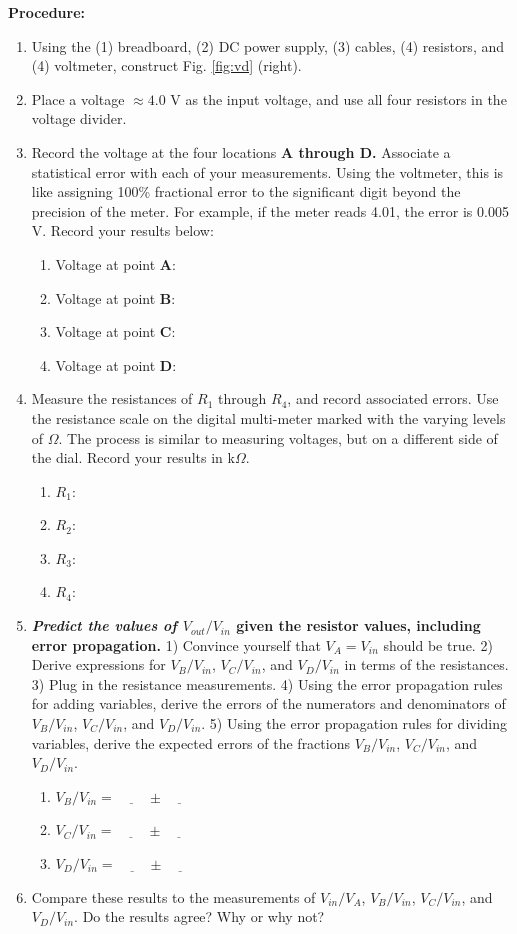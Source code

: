 \documentclass[12pt]{article}
\begin{document}
\textbf{Procedure:}

\begin{enumerate}
\item Using the (1) breadboard, (2) DC power supply, (3) cables, (4) resistors, and (4) voltmeter, construct Fig. \ref{fig:vd} (right).
\item Place a voltage $\approx 4.0$ V as the input voltage, and use all four resistors in the voltage divider.
\item Record the voltage at the four locations \textbf{A through D.}  Associate a statistical error with each of your measurements.  Using the voltmeter, this is like assigning 100\% fractional error to the significant digit beyond the precision of the meter.  For example, if the meter reads 4.01, the error is 0.005 V.  Record your results below:
\begin{enumerate}
\item Voltage at point \textbf{A}:
\item Voltage at point \textbf{B}:
\item Voltage at point \textbf{C}:
\item Voltage at point \textbf{D}:
\end{enumerate}
\item Measure the resistances of $R_1$ through $R_4$, and record associated errors.  Use the resistance scale on the digital multi-meter marked with the varying levels of $\Omega$.  The process is similar to measuring voltages, but on a different side of the dial.  Record your results in k$\Omega$.
\begin{enumerate}
\item $R_1$: 
\item $R_2$: 
\item $R_3$: 
\item $R_4$: 
\end{enumerate}
\item \textbf{\textit{Predict the values of $V_{out}/V_{in}$} given the resistor values, including error propagation.}  1) Convince yourself that $V_A = V_{in}$ should be true.  2) Derive expressions for $V_B/V_{in}$, $V_C/V_{in}$, and $V_D/V_{in}$ in terms of the resistances.  3) Plug in the resistance measurements.  4) Using the error propagation rules for adding variables, derive the errors of the numerators and denominators of $V_B/V_{in}$, $V_C/V_{in}$, and $V_D/V_{in}$.  5) Using the error propagation rules for dividing variables, derive the expected errors of the fractions $V_B/V_{in}$, $V_C/V_{in}$, and $V_D/V_{in}$. \\ \vspace{4cm}
\begin{enumerate}
\item $V_B/V_{in}=\underline{~~~~~~~~~~}\pm\underline{~~~~~~~~~~}$
\item $V_C/V_{in}=\underline{~~~~~~~~~~}\pm\underline{~~~~~~~~~~}$
\item $V_D/V_{in}=\underline{~~~~~~~~~~}\pm\underline{~~~~~~~~~~}$
\end{enumerate}
\item Compare these results to the measurements of $V_{in}/V_A$, $V_B/V_{in}$, $V_C/V_{in}$, and $V_D/V_{in}$.  Do the results agree?  Why or why not?
\end{enumerate}
\end{document}
